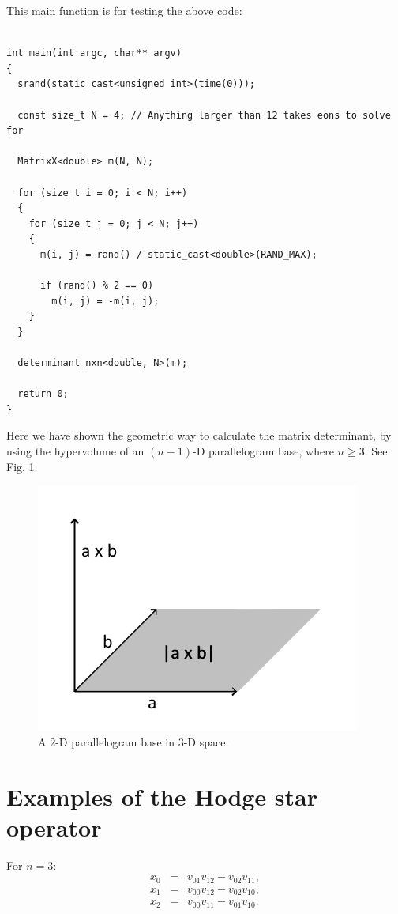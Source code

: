 \documentclass[12pt]{article}
\begin{document}
This main function is for testing the above code:
\begin{lstlisting}

int main(int argc, char** argv)
{
  srand(static_cast<unsigned int>(time(0)));

  const size_t N = 4; // Anything larger than 12 takes eons to solve for

  MatrixX<double> m(N, N);

  for (size_t i = 0; i < N; i++)
  {
    for (size_t j = 0; j < N; j++)
    {
      m(i, j) = rand() / static_cast<double>(RAND_MAX);

      if (rand() % 2 == 0)
        m(i, j) = -m(i, j);
    }
  }

  determinant_nxn<double, N>(m);

  return 0;
}
\end{lstlisting}
Here we have shown the geometric way to calculate the matrix determinant, by using the hypervolume of an $(n - 1)$-D parallelogram base, where $n \ge 3$. 
See Fig. 1.
\begin{figure} 
\centering
  \includegraphics[width = 3 in]{parallelogram.png}
  \caption{
A $2$-D parallelogram base in $3$-D space.
}
\end{figure}

\section{Examples of the Hodge star operator}
For $n = 3$:
\begin{eqnarray}
x_{0} &=& v_{01} v_{12} - v_{02} v_{11},\\
x_{1} &=& v_{00} v_{12} - v_{02} v_{10},\\
x_{2} &=& v_{00} v_{11} - v_{01} v_{10}.
\end{eqnarray}
\end{document}
